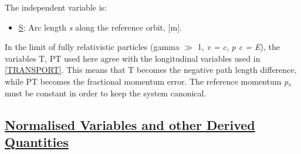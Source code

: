 The independent variable is: 
\begin{itemize}
	\item \href{s}{S}: Arc length \textit{s} along the reference
          orbit, [m].   
\end{itemize} 

In the limit of fully relativistic particles (gamma $\gg$ 1, \textit{v
  = c}, \textit{p c = E}), the variables T, PT used here agree with the
longitudinal variables used in
\href{bibliography.html#transport}{[TRANSPORT]}. This means that T
becomes the negative path length difference, while PT becomes the
fractional momentum error. The reference momentum \textit{p$_s$} must be
constant in order to keep the system canonical.  

\subsection{\href{normal}{Normalised Variables and other Derived Quantities}}
